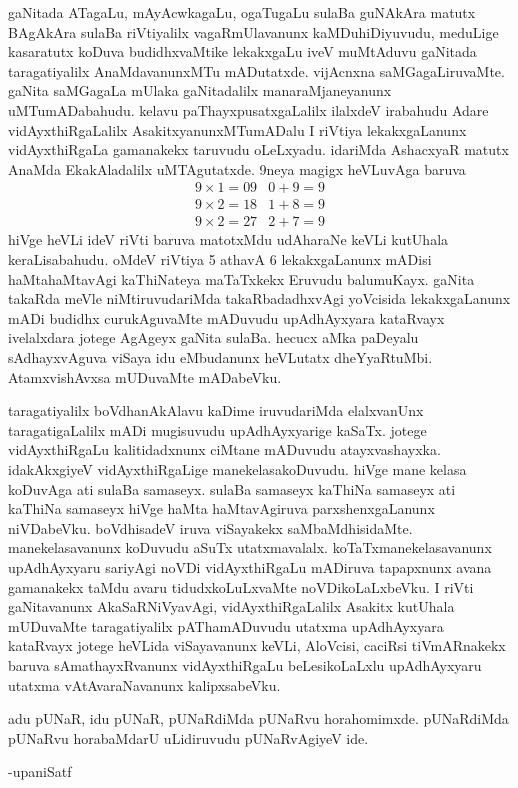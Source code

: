gaNitada ATagaLu, mAyAcwkagaLu, ogaTugaLu sulaBa guNAkAra matutx BAgAkAra sulaBa riVtiyalilx vagaRmUlavanunx kaMDuhiDiyuvudu, meduLige kasaratutx koDuva budidhxvaMtike lekakxgaLu iveV muMtAduvu gaNitada taragatiyalilx AnaMdavanunxMTu mADutatxde. vijAcnxna saMGagaLiruvaMte. gaNita saMGagaLa mUlaka gaNitadalilx manaraMjaneyanunx uMTumADabahudu. kelavu paThayxpusatxgaLalilx ilalxdeV irabahudu Adare vidAyxthiRgaLalilx AsakitxyanunxMTumADalu I riVtiya lekakxgaLanunx vidAyxthiRgaLa gamanakekx taruvudu oLeLxyadu. idariMda AshacxyaR matutx AnaMda EkakAladalilx uMTAgutatxde. {\rm 9}neya magigx heVLuvAga baruva 
$$
\begin{matrix}
9\times 1=09 & 0+9 = 9\\
9\times 2=18 & 1+8 = 9\\
9\times 2=27 & 2+7 = 9
\end{matrix}
$$ hiVge heVLi ideV riVti baruva matotxMdu udAharaNe keVLi kutUhala keraLisabahudu. oMdeV riVtiya {\rm 5} athavA {\rm 6} lekakxgaLanunx mADisi haMtahaMtavAgi kaThiNateya maTaTxkekx Eruvudu balumuKayx. gaNita takaRda meVle niMtiruvudariMda takaRbadadhxvAgi yoVcisida lekakxgaLanunx mADi budidhx curukAguvaMte mADuvudu upAdhAyxyara kataRvayx ivelalxdara jotege AgAgeyx gaNita sulaBa. hecucx aMka paDeyalu sAdhayxvAguva viSaya idu eMbudanunx heVLutatx dheYyaRtuMbi. AtamxvishAvxsa mUDuvaMte mADabeVku.

taragatiyalilx boVdhanAkAlavu kaDime iruvudariMda elalxvanUnx taragatigaLalilx mADi mugisuvudu upAdhAyxyarige kaSaTx. jotege vidAyxthiRgaLu kalitidadxnunx ciMtane mADuvudu atayxvashayxka. idakAkxgiyeV vidAyxthiRgaLige manekelasakoDuvudu. hiVge mane kelasa koDuvAga ati sulaBa samaseyx. sulaBa samaseyx kaThiNa samaseyx ati kaThiNa samaseyx hiVge haMta haMtavAgiruva parxshenxgaLanunx niVDabeVku. boVdhisadeV iruva viSayakekx saMbaMdhisidaMte.
manekelasavanunx koDuvudu aSuTx utatxmavalalx. koTaTxmanekelasavanunx upAdhAyxyaru sariyAgi noVDi vidAyxthiRgaLu mADiruva tapapxnunx avana gamanakekx taMdu avaru tidudxkoLuLxvaMte noVDikoLaLxbeVku. I riVti gaNitavanunx AkaSaRNiVyavAgi, vidAyxthiRgaLalilx Asakitx kutUhala mUDuvaMte taragatiyalilx pAThamADuvudu utatxma upAdhAyxyara kataRvayx jotege heVLida viSayavanunx keVLi, AloVcisi, caciRsi tiVmARnakekx baruva sAmathayxRvanunx vidAyxthiRgaLu beLesikoLaLxlu upAdhAyxyaru utatxma vAtAvaraNavanunx kalipxsabeVku.

adu pUNaR, idu pUNaR, pUNaRdiMda pUNaRvu horahomimxde. pUNaRdiMda pUNaRvu horabaMdarU uLidiruvudu pUNaRvAgiyeV ide.

\begin{flushright}
-upaniSatf
\end{flushright}
